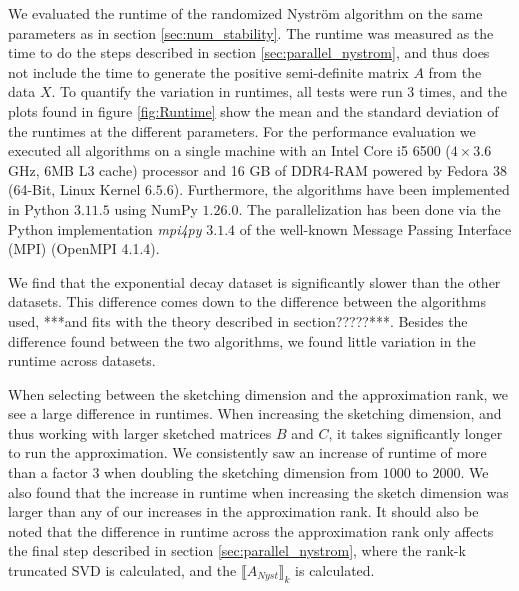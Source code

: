 \documentclass{article}
\theoremstyle{definition}
\begin{document}
We evaluated the runtime of the randomized Nyström algorithm on the same parameters as in section \ref{sec:num_stability}. The runtime was measured as the time to do the steps described in section \ref{sec:parallel_nystrom}, and thus does not include the time to generate the positive semi-definite matrix $A$ from the data $X$. To quantify the variation in runtimes, all tests were run 3 times, and the plots found in figure \ref{fig:Runtime} show the mean and the standard deviation of the runtimes at the different parameters. For the performance evaluation we executed all algorithms on a single machine with an Intel Core i5 6500 ($4 \times 3.6$ GHz, $6$MB L3 cache) processor and 16 GB of DDR4-RAM powered by Fedora 38 (64-Bit, Linux Kernel $6.5.6$). Furthermore, the algorithms have been implemented in Python $3.11.5$ using NumPy $1.26.0$. The parallelization has been done via the Python implementation \textit{mpi4py} $3.1.4$ of the well-known Message Passing Interface (MPI) (OpenMPI 4.1.4).\newline

We find that the exponential decay dataset is significantly slower than the other datasets. This difference comes down to the difference between the algorithms used, ***and fits with the theory described in section?????***. Besides the difference found between the two algorithms, we found little variation in the runtime across datasets. \newline

When selecting between the sketching dimension and the approximation rank, we see a large difference in runtimes. When increasing the sketching dimension, and thus working with larger sketched matrices $B$ and $C$, it takes significantly longer to run the approximation. We consistently saw an increase of runtime of more than a factor 3 when doubling the sketching dimension from $1000$ to $2000$. We also found that the increase in runtime when increasing the sketch dimension was larger than any of our increases in the approximation rank. It should also be noted that the difference in runtime across the approximation rank only affects the final step described in section \ref{sec:parallel_nystrom}, where the rank-k truncated SVD is calculated, and the $\llbracket A_{Nyst}\rrbracket_k$ is calculated.

\end{document}
